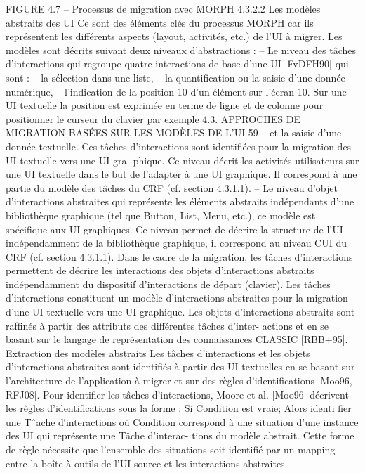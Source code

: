 \documentclass{article}
\begin{document}
 
FIGURE 4.7 – Processus de migration avec MORPH
4.3.2.2
Les modèles abstraits des UI
Ce sont des éléments clés du processus MORPH car ils représentent les différents aspects (layout,
activités, etc.) de l’UI à migrer. Les modèles sont décrits suivant deux niveaux d’abstractions :
– Le niveau des tâches d’interactions qui regroupe quatre interactions de base d’une UI
[FvDFH90] qui sont :
– la sélection dans une liste,
– la quantiﬁcation ou la saisie d’une donnée numérique,
– l’indication de la position 10 d’un élément sur l’écran
10. Sur une UI textuelle la position est exprimée en terme de ligne et de colonne pour positionner le curseur du clavier
par exemple
4.3. APPROCHES DE MIGRATION BASÉES SUR LES MODÈLES DE L’UI
59
– et la saisie d’une donnée textuelle.
Ces tâches d’interactions sont identiﬁées pour la migration des UI textuelle vers une UI gra-
phique. Ce niveau décrit les activités utilisateurs sur une UI textuelle dans le but de l’adapter à
une UI graphique. Il correspond à une partie du modèle des tâches du CRF (cf. section 4.3.1.1).
– Le niveau d’objet d’interactions abstraites qui représente les éléments abstraits indépendants
d’une bibliothèque graphique (tel que Button, List, Menu, etc.), ce modèle est spéciﬁque aux UI
graphiques. Ce niveau permet de décrire la structure de l’UI indépendamment de la bibliothèque
graphique, il correspond au niveau CUI du CRF (cf. section 4.3.1.1).
Dans le cadre de la migration, les tâches d’interactions permettent de décrire les interactions des
objets d’interactions abstraits indépendamment du dispositif d’interactions de départ (clavier).
Les tâches d’interactions constituent un modèle d’interactions abstraites pour la migration d’une
UI textuelle vers une UI graphique.
Les objets d’interactions abstraits sont rafﬁnés à partir des attributs des différentes tâches d’inter-
actions et en se basant sur le langage de représentation des connaissances CLASSIC [RBB+95].
Extraction des modèles abstraits
Les tâches d’interactions et les objets d’interactions abstraites
sont identiﬁés à partir des UI textuelles en se basant sur l’architecture de l’application à migrer et
sur des règles d’identiﬁcations [Moo96, RFJ08]. Pour identiﬁer les tâches d’interactions, Moore et
al. [Moo96] décrivent les règles d’identiﬁcations sous la forme :
Si Condition est vraie; Alors identi fier une Tˆache d′interactions
où Condition correspond à une situation d’une instance des UI qui représente une Tâche d’interac-
tions du modèle abstrait. Cette forme de règle nécessite que l’ensemble des situations soit identiﬁé
par un mapping entre la boîte à outils de l’UI source et les interactions abstraites.
\end{document}
